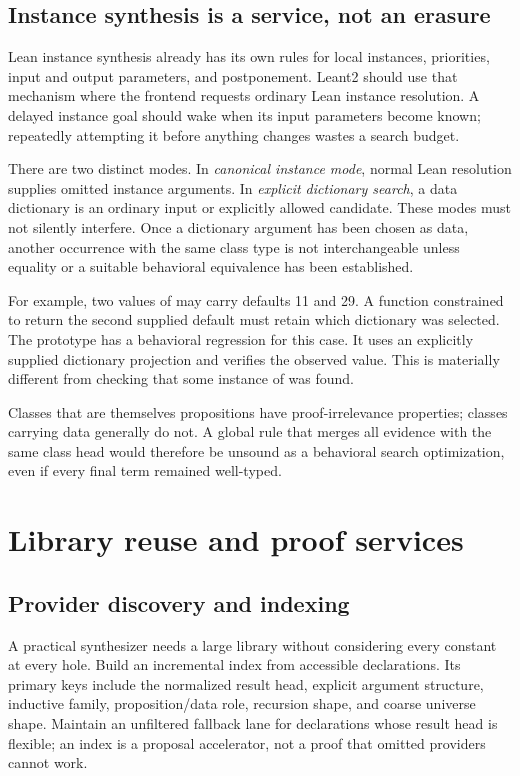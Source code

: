 \documentclass[11pt,letterpaper]{article}
\newcommand{\code}[1]{\texttt{\detokenize{#1}}}
\theoremstyle{definition}\newtheorem{definition}[theorem]{Definition}
\theoremstyle{remark}\newtheorem{remark}[theorem]{Remark}
\begin{document}
\subsection{Instance synthesis is a service, not an erasure}

Lean instance synthesis already has its own rules for local instances, priorities,
input and output parameters, and postponement. Leant2 should use that mechanism
where the frontend requests ordinary Lean instance resolution.\cite{instances}
A delayed instance goal should wake when its input parameters become known;
repeatedly attempting it before anything changes wastes a search budget.

There are two distinct modes. In \emph{canonical instance mode}, normal Lean
resolution supplies omitted instance arguments. In \emph{explicit dictionary
search}, a data dictionary is an ordinary input or explicitly allowed candidate.
These modes must not silently interfere. Once a dictionary argument has been
chosen as data, another occurrence with the same class type is not interchangeable
unless equality or a suitable behavioral equivalence has been established.

For example, two values of \code{Inhabited Nat} may carry defaults 11 and 29.
A function constrained to return the second supplied default must retain which
dictionary was selected. The prototype has a behavioral regression for this
case. It uses an explicitly supplied dictionary projection and verifies the
observed value. This is materially different from checking that some instance
of \code{Inhabited Nat} was found.

Classes that are themselves propositions have proof-irrelevance properties;
classes carrying data generally do not. A global rule that merges all evidence
with the same class head would therefore be unsound as a behavioral search
optimization, even if every final term remained well-typed.

\section{Library reuse and proof services}
\label{sec:library}

\subsection{Provider discovery and indexing}

A practical synthesizer needs a large library without considering every constant
at every hole. Build an incremental index from accessible declarations. Its
primary keys include the normalized result head, explicit argument structure,
inductive family, proposition/data role, recursion shape, and coarse universe
shape. Maintain an unfiltered fallback lane for declarations whose result head
is flexible; an index is a proposal accelerator, not a proof that omitted
providers cannot work.
\end{document}
